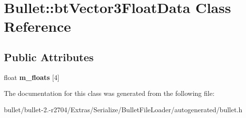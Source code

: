 \hypertarget{class_bullet_1_1bt_vector3_float_data}{\section{Bullet\+:\+:bt\+Vector3\+Float\+Data Class Reference}
\label{class_bullet_1_1bt_vector3_float_data}
}
\subsection*{Public Attributes}
\begin{DoxyCompactItemize}
\item 
\hypertarget{class_bullet_1_1bt_vector3_float_data_a95dfa85f658b74f2128a9cc6476b001d}{float {\bfseries m\+\_\+floats} \mbox{[}4\mbox{]}}\label{class_bullet_1_1bt_vector3_float_data_a95dfa85f658b74f2128a9cc6476b001d}

\end{DoxyCompactItemize}


The documentation for this class was generated from the following file\+:\begin{DoxyCompactItemize}
\item 
bullet/bullet-\/2.-\/r2704/\+Extras/\+Serialize/\+Bullet\+File\+Loader/autogenerated/bullet.\+h\end{DoxyCompactItemize}
